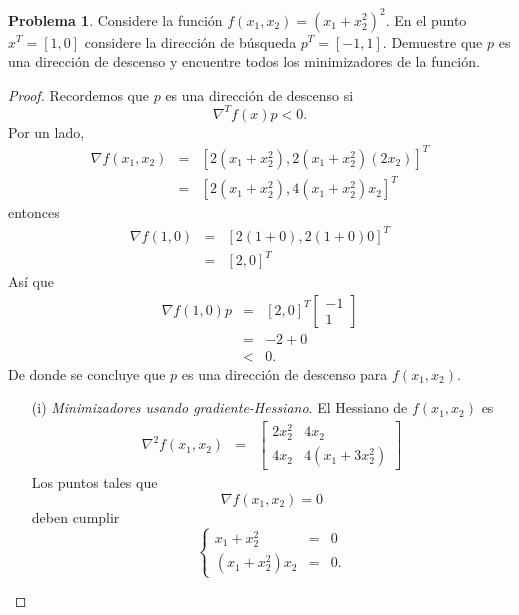 \documentclass[12pt,letterpaper]{article}
\theoremstyle{definition}
\newtheorem{problm}{Problema}
\begin{document}
\begin{problm}
	Considere la función $ f(x_1, x_2) = (x_1 + x_2^2)^2 $. En el punto $ x^T = [1,0] $ considere la dirección de búsqueda $ p^T = [-1,1] $. Demuestre que $ p $ es una dirección de descenso y encuentre todos los minimizadores de la función.
	\begin{proof}
		Recordemos que $ p $ es una dirección de descenso si
		\[ \nabla^T f(x) p < 0. \]
		Por un lado,
		\begin{eqnarray*}
			\nabla f(x_1, x_2) & = & \left[ 2(x_1 + x_2^2), 2(x_1+ x_2 ^2) (2x_2) \right]^T \\
							   & = & \left[ 2(x_1 + x_2^2), 4(x_1+ x_2 ^2) x_2 \right]^T
		\end{eqnarray*}
		entonces
		\begin{eqnarray*}
			\nabla f(1, 0) & = & \left[ 2(1 + 0), 2(1+0) 0 \right]^T \\
			               & = & \left[ 2, 0 \right]^T
		\end{eqnarray*}
		Así que 
		\begin{eqnarray*}
			\nabla f(1, 0) p  & = & \left[ 2, 0 \right]^T
									\left[\begin{matrix}
										-1\\
										1
									\end{matrix}\right] \\
			                  & = & -2 + 0 \\
			                  & < & 0.
		\end{eqnarray*}
		De donde se concluye que $ p $ es una dirección de descenso para $ f(x_1, x_2) $.
		\begin{itemize}
			\item[(i)] \textit{Minimizadores usando gradiente-Hessiano}. El Hessiano de $ f(x_1, x_2) $ es
			\begin{eqnarray}
				\nabla^2 f(x_1, x_2) & = & \left[\begin{matrix}
												2 x_2^2 & 4 x_2 \\
												4 x_2   & 4(x_1 + 3 x_2^2)
				\end{matrix}\right]
			\end{eqnarray} 
			Los puntos tales que 
			\[ \nabla f(x_1, x_2) = 0 \]
			deben cumplir
			\begin{equation}
				\left\{\begin{matrix}
					x_1 + x_2^2 & = & 0 \\
					(x_1 + x_2^2) x_2 & = & 0.
				\end{matrix}\right.

\end{equation}
\end{itemize}
\end{proof}
\end{problm}
\end{document}
